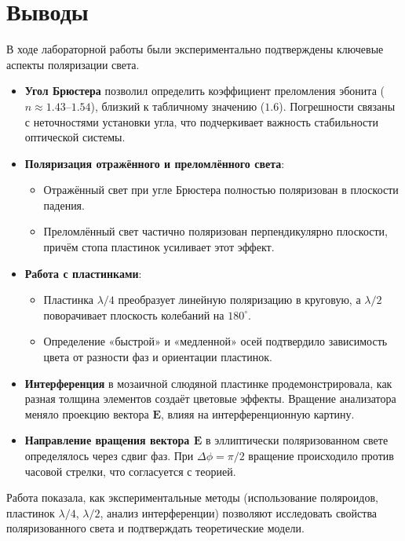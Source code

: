 \section{Выводы}

В ходе лабораторной работы были экспериментально подтверждены ключевые аспекты поляризации света.  

\begin{itemize}
    \item \textbf{Угол Брюстера} позволил определить коэффициент преломления эбонита (\( n \approx 1.43–1.54 \)), близкий к табличному значению (\( 1.6 \)). Погрешности связаны с неточностями установки угла, что подчеркивает важность стабильности оптической системы.  

    \item \textbf{Поляризация отражённого и преломлённого света}:
    \begin{itemize}
        \item Отражённый свет при угле Брюстера полностью поляризован в плоскости падения.  
        \item Преломлённый свет частично поляризован перпендикулярно плоскости, причём стопа пластинок усиливает этот эффект.  
    \end{itemize}

    \item \textbf{Работа с пластинками}:
    \begin{itemize}
        \item Пластинка \( \lambda/4 \) преобразует линейную поляризацию в круговую, а \( \lambda/2 \) поворачивает плоскость колебаний на \( 180^\circ \).  
        \item Определение «быстрой» и «медленной» осей подтвердило зависимость цвета от разности фаз и ориентации пластинок.  
    \end{itemize}

    \item \textbf{Интерференция} в мозаичной слюдяной пластинке продемонстрировала, как разная толщина элементов создаёт цветовые эффекты. Вращение анализатора меняло проекцию вектора \( \mathbf{E} \), влияя на интерференционную картину.  

    \item \textbf{Направление вращения вектора \( \mathbf{E} \)} в эллиптически поляризованном свете определялось через сдвиг фаз. При \( \Delta\phi = \pi/2 \) вращение происходило против часовой стрелки, что согласуется с теорией.  
\end{itemize}

Работа показала, как экспериментальные методы (использование поляроидов, пластинок \( \lambda/4 \), \( \lambda/2 \), анализ интерференции) позволяют исследовать свойства поляризованного света и подтверждать теоретические модели.